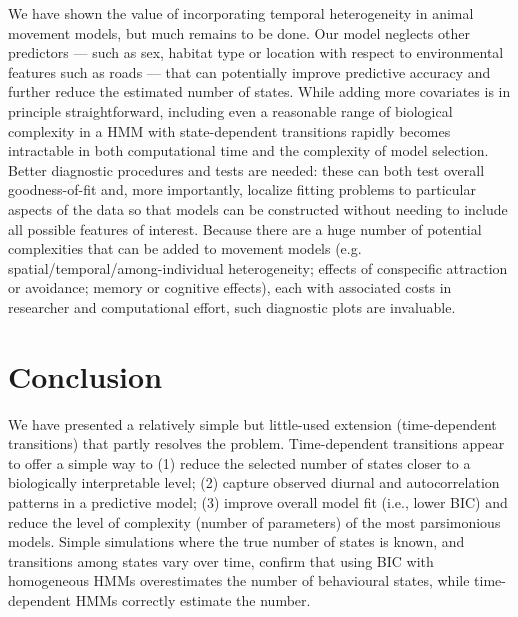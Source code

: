 \documentclass{bmcart}
\begin{document}
We have shown the value of incorporating temporal heterogeneity in 
animal movement models, but much remains to be done. 
Our model neglects other predictors --- such as sex, habitat type or
location with respect to environmental features such as roads --- %
that can potentially improve predictive accuracy and 
further reduce the estimated number of states. While adding
more covariates is in principle straightforward, 
including even a reasonable range of biological complexity in 
a HMM with state-dependent transitions rapidly becomes intractable
in both computational time and the complexity of model selection.
Better diagnostic procedures and tests are needed:
these can both test overall goodness-of-fit \cite{potts_generalized_2014} 
and, more importantly, localize fitting problems to particular aspects of the
data so that models can be constructed without needing to
include all possible features of interest. Because there are a huge number of potential complexities that can be added to movement models (e.g. spatial/temporal/among-individual heterogeneity; effects of conspecific attraction or avoidance; memory or cognitive effects), each with associated costs in researcher and computational effort, such diagnostic plots are invaluable.

\section*{Conclusion}

We have presented a relatively simple but little-used extension
(time-dependent transitions) that partly resolves the problem.
Time-dependent transitions appear to offer a simple way to (1) reduce
the selected number of states closer to a biologically interpretable
level; (2) capture observed diurnal and autocorrelation patterns in a
predictive model; (3) improve overall model fit (i.e., lower BIC) and
reduce the level of complexity (number of parameters) of the most
parsimonious models. Simple simulations where the true number of
states is known, and transitions among states vary over time, confirm
that using BIC with homogeneous HMMs overestimates the number of
behavioural states, while time-dependent HMMs correctly estimate
the number.

\end{document}
